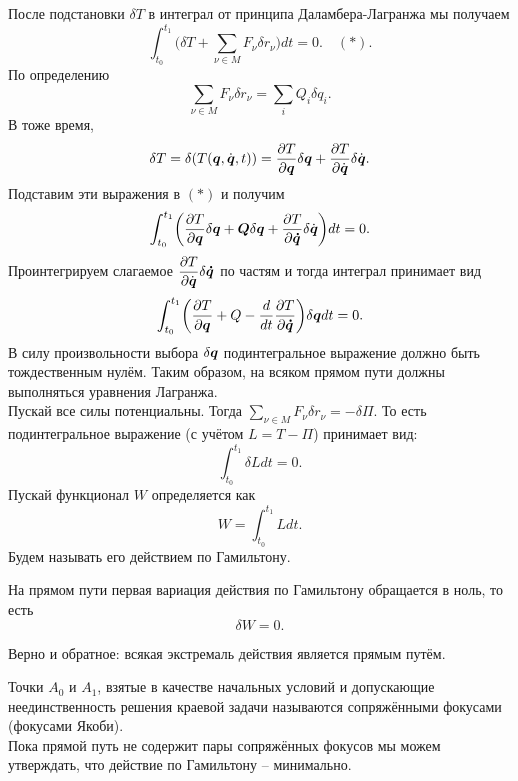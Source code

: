 После подстановки $\delta T$ в интеграл от принципа Даламбера-Лагранжа мы получаем
\[
    \int_{t_0}^{t_1} \biggr(\delta T + \sum\limits_{\nu \in M} F_{\nu}\delta r_{\nu}\biggr) dt = 0. \quad (*).
\]
По определению
\[
    \sum\limits_{\nu \in M} F_{\nu} \delta r_{\nu} = \sum\limits_{i} Q_{i} \delta q_i.
\]
В тоже время,
\[
    \delta T = \delta(T(\boldsymbol{q}, \dot{\boldsymbol{q}}, t)) = \dfrac{\partial T}{\partial \boldsymbol{q}}\delta \boldsymbol{q} + \dfrac{\partial T}{\partial \dot{\boldsymbol{q}}} \delta \dot{\boldsymbol{q}}.
\]
Подставим эти выражения в $(*)$ и получим
\[
    \int_{t_0}^{t_1} \biggr( \dfrac{\partial T}{\partial \boldsymbol{q}} \delta \boldsymbol{q} + \boldsymbol{Q} \delta \boldsymbol{q} + \dfrac{\partial T}{\partial \boldsymbol{\dot{q}}} \delta \dot{\boldsymbol{q}} \biggr)dt = 0.
\]
Проинтегрируем слагаемое $\dfrac{\partial T}{\partial \dot{\boldsymbol{q}}} \delta \boldsymbol{\dot{q}}$ по частям и тогда интеграл принимает вид
\[
    \int_{t_0}^{t_1} \biggr( \dfrac{\partial T}{\partial \boldsymbol{q}} + Q - \dfrac{d}{dt} \dfrac{ \partial T}{\partial \boldsymbol{\dot{q}}} \biggr)\delta \boldsymbol{q} dt = 0.
\]
В силу произвольности выбора $\delta \boldsymbol{q}$ подинтегральное выражение должно быть тождественным нулём.
Таким образом, на всяком прямом пути должны выполняться уравнения Лагранжа. \\
Пускай все силы потенциальны. Тогда $\sum\limits_{\nu \in M} F_{\nu} \delta r_{\nu} = - \delta \Pi$.
То есть подинтегральное выражение (с учётом $L = T - \Pi$) принимает вид:
\[
    \int_{t_0}^{t_1} \delta L dt = 0.
\]
Пускай функционал $W$ определяется как
\[
    W = \int_{t_0}^{t_1} Ldt.
\]
Будем называть его действием по Гамильтону.
\begin{theorem}
    На прямом пути первая вариация действия по Гамильтону обращается в ноль, то есть
    \[
        \delta W = 0.
    \]
\end{theorem}
\begin{theorem}
    Верно и обратное: всякая экстремаль действия является прямым путём.
\end{theorem}
\begin{note}
    Точки $A_0$ и $A_1$, взятые в качестве начальных условий и допускающие неединственность решения краевой задачи называются сопряжёнными фокусами (фокусами Якоби). \\
    Пока прямой путь не содержит пары сопряжённых фокусов мы можем утверждать, что действие по Гамильтону -- минимально.
\end{note}
